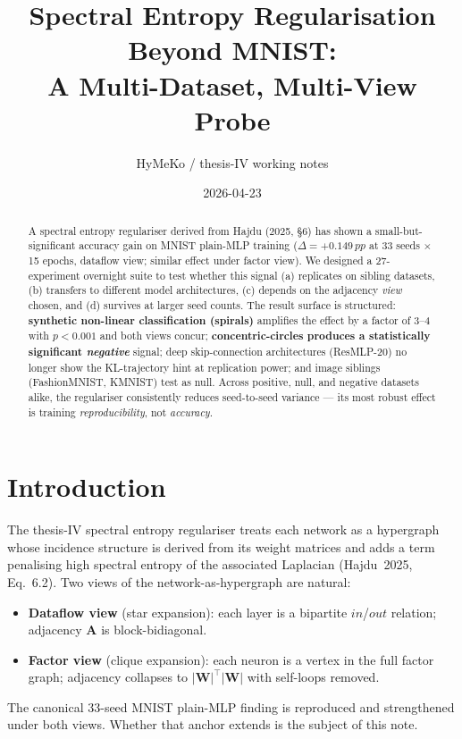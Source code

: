 \documentclass[11pt,a4paper]{article}
\title{Spectral Entropy Regularisation Beyond MNIST:\\
  A Multi-Dataset, Multi-View Probe}
\author{HyMeKo / thesis-IV working notes}
\date{2026-04-23}
\newcommand{\pp}{\,pp\xspace}
\begin{document}
\maketitle

\begin{abstract}
A spectral entropy regulariser derived from Hajdu (2025, \S6) has shown
a small-but-significant accuracy gain on MNIST plain-MLP training
($\Delta=+0.149\pp$ at 33 seeds $\times$ 15 epochs, dataflow view;
similar effect under factor view). We designed a 27-experiment overnight
suite to test whether this signal (a) replicates on sibling datasets,
(b) transfers to different model architectures, (c) depends on the
adjacency \emph{view} chosen, and (d) survives at larger seed counts.
The result surface is structured: \textbf{synthetic non-linear
classification (spirals)} amplifies the effect by a factor of 3--4 with
$p<0.001$ and both views concur; \textbf{concentric-circles produces a
statistically significant \emph{negative}} signal; deep skip-connection
architectures (ResMLP-20) no longer show the KL-trajectory hint at
replication power; and image siblings (FashionMNIST, KMNIST) test as
null. Across positive, null, and negative datasets alike, the
regulariser consistently reduces seed-to-seed variance --- its most
robust effect is training \emph{reproducibility}, not \emph{accuracy}.
\end{abstract}

\section{Introduction}

The thesis-IV spectral entropy regulariser treats each network as a
hypergraph whose incidence structure is derived from its weight matrices
and adds a term penalising high spectral entropy of the associated
Laplacian (Hajdu~2025, Eq.~6.2). Two views of the network-as-hypergraph
are natural:
\begin{itemize}
  \item \textbf{Dataflow view} (star expansion): each layer is a
    bipartite $\mathit{in}$/$\mathit{out}$ relation; adjacency
    $\mathbf{A}$ is block-bidiagonal.
  \item \textbf{Factor view} (clique expansion): each neuron is a
    vertex in the full factor graph; adjacency collapses to
    $|\mathbf{W}|^\top|\mathbf{W}|$ with self-loops removed.
\end{itemize}
The canonical 33-seed MNIST plain-MLP finding is reproduced and
strengthened under both views. Whether that anchor extends is the
subject of this note.
\end{document}
